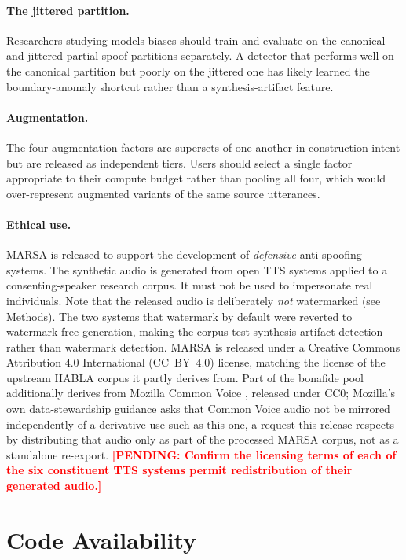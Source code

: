 \documentclass[11pt]{article}
\newcommand{\PENDING}[1]{\textcolor{red}{\textbf{[PENDING: #1]}}}
\begin{document}
\paragraph{The jittered partition.} Researchers studying models biases should train and evaluate on the canonical and jittered
partial-spoof partitions separately. A detector that performs well on the
canonical partition but poorly on the jittered one has likely learned the
boundary-anomaly shortcut rather than a synthesis-artifact feature.

\paragraph{Augmentation.} The four augmentation factors are supersets of
one another in construction intent but are released as independent tiers.
Users should select a single factor appropriate to their compute budget
rather than pooling all four, which would over-represent augmented
variants of the same source utterances.

\paragraph{Ethical use.} MARSA is released to support the development of
\emph{defensive} anti-spoofing systems. The synthetic audio is generated from open TTS systems applied to a consenting-speaker
research corpus. It must not be used to impersonate real individuals.
Note that the released audio is deliberately \emph{not} watermarked (see
Methods). The two systems that watermark by default were reverted to
watermark-free generation, making the corpus test synthesis-artifact
detection rather than watermark detection. MARSA is released under a
Creative Commons Attribution 4.0 International (CC~BY~4.0) license,
matching the license of the upstream HABLA corpus \citep{habla} it
partly derives from. Part of the bonafide pool additionally derives
from Mozilla Common Voice \citep{commonvoice}, released under CC0;
Mozilla's own data-stewardship guidance asks that Common Voice audio
not be mirrored independently of a derivative use such as this one, a
request this release respects by distributing that audio only as part
of the processed MARSA corpus, not as a standalone re-export.
\PENDING{Confirm the licensing terms of each of the six constituent TTS
systems permit redistribution of their generated audio.}

\FloatBarrier
\section*{Code Availability}
\end{document}
